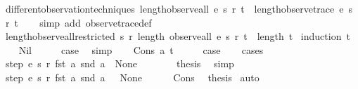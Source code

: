 \begin{isabellebody}
\isanewline
{}\isamarkupfalse%
\ different{\isacharunderscore}observation{\isacharunderscore}techniques{\isacharcolon}\ {\isachardoublequoteopen}length{\isacharparenleft}observe{\isacharunderscore}all\ e\ s\ r\ t{\isacharparenright}\ {\isacharequal}\ length{\isacharparenleft}observe{\isacharunderscore}trace\ e\ s\ r\ t{\isacharparenright}{\isachardoublequoteclose}\isanewline
%
\isadelimproof
\ \ %
\endisadelimproof
%
\isatagproof
{}\isamarkupfalse%
\ {\isacharparenleft}simp\ add{\isacharcolon}\ observe{\isacharunderscore}trace{\isacharunderscore}def{\isacharparenright}%
\endisatagproof
{\isafoldproof}%
%
\isadelimproof
\isanewline
%
\endisadelimproof
\isanewline
{}\isamarkupfalse%
\ length{\isacharunderscore}observe{\isacharunderscore}all{\isacharunderscore}restricted{\isacharcolon}\ {\isachardoublequoteopen}{\isasymAnd}s\ r{\isachardot}\ length\ {\isacharparenleft}observe{\isacharunderscore}all\ e\ s\ r\ t{\isacharparenright}\ {\isasymle}\ length\ t{\isachardoublequoteclose}\isanewline
%
\isadelimproof
%
\endisadelimproof
%
\isatagproof
{}\isamarkupfalse%
\ {\isacharparenleft}induction\ t{\isacharparenright}\isanewline
\ \ \isamarkupfalse%
\ Nil\isanewline
\ \ \isamarkupfalse%
\ \isamarkupfalse%
\ {\isacharquery}case\ \isamarkupfalse%
\ simp\isanewline
{}\isamarkupfalse%
\isanewline
\ \ \isamarkupfalse%
\ {\isacharparenleft}Cons\ a\ t{\isacharparenright}\isanewline
\ \ \isamarkupfalse%
\ \isamarkupfalse%
\ {\isacharquery}case\isanewline
\ \ \isamarkupfalse%
\ cases\isanewline
\ \ \ \ \isamarkupfalse%
\ {\isachardoublequoteopen}step\ e\ s\ r\ {\isacharparenleft}fst\ a{\isacharparenright}\ {\isacharparenleft}snd\ a{\isacharparenright}\ {\isacharequal}\ None{\isachardoublequoteclose}\isanewline
\ \ \ \ \isamarkupfalse%
\ \isamarkupfalse%
\ {\isacharquery}thesis\ \isamarkupfalse%
\ simp\isanewline
\ \ \isamarkupfalse%
\isanewline
\ \ \ \ \isamarkupfalse%
\ {\isachardoublequoteopen}step\ e\ s\ r\ {\isacharparenleft}fst\ a{\isacharparenright}\ {\isacharparenleft}snd\ a{\isacharparenright}\ {\isasymnoteq}\ \ None{\isachardoublequoteclose}\isanewline
\ \ \ \ \isamarkupfalse%
\ Cons\ \isamarkupfalse%
\ {\isacharquery}thesis\ \isamarkupfalse%
{\isacharparenleft}auto{\isacharparenright}\isanewline
\ \ \isamarkupfalse%

\end{isabellebody}
